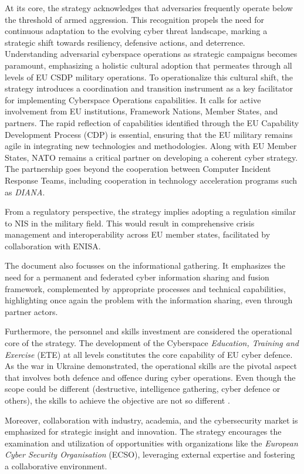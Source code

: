 At its core, the strategy acknowledges that adversaries frequently operate below the threshold of armed aggression. This recognition propels the need for continuous adaptation to the evolving cyber threat landscape, marking a strategic shift towards resiliency, defensive actions, and deterrence. Understanding adversarial cyberspace operations as strategic campaigns becomes paramount, emphasizing a holistic cultural adoption that permeates through all levels of EU CSDP military operations. To operationalize this cultural shift, the strategy introduces a coordination and transition instrument as a key facilitator for implementing Cyberspace Operations capabilities. It calls for active involvement from EU institutions, Framework Nations, Member States, and partners. The rapid reflection of capabilities identified through the EU Capability Development Process (CDP) is essential, ensuring that the EU military remains agile in integrating new technologies and methodologies. Along with EU Member States, NATO remains a critical partner on developing a coherent cyber strategy. The partnership goes beyond the cooperation between Computer Incident Response Teams, including cooperation in technology acceleration programs such as \textit{DIANA}. 

From a regulatory perspective, the strategy implies adopting a regulation similar to NIS in the military field. This would result in comprehensive crisis management and interoperability across EU member states, facilitated by collaboration with ENISA.

The document also focusses on the informational gathering. It emphasizes the need for a permanent and federated cyber information sharing and fusion framework, complemented by appropriate processes and technical capabilities, highlighting once again the problem with the information sharing, even through partner actors.

Furthermore, the personnel and skills investment are considered the operational core of the strategy. The development of the Cyberspace\textit{ Education, Training and Exercise} (ETE) at all levels constitutes the core capability of EU cyber defence. As the war in Ukraine demonstrated, the operational skills are the pivotal aspect that involves both defence and offence during cyber operations. Even though the scope could be different (destructive, intelligence gathering, cyber defence or others), the skills to achieve the objective are not so different \autocite{slayton_2017_what}.  

Moreover, collaboration with industry, academia, and the cybersecurity market is emphasized for strategic insight and innovation. The strategy encourages the examination and utilization of opportunities with organizations like the  \textit{European Cyber Security Organisation} (ECSO), leveraging external expertise and fostering a collaborative environment.

